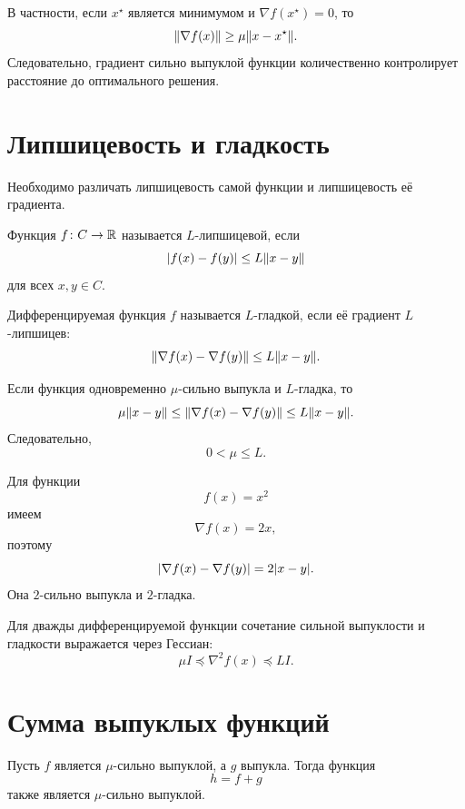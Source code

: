 В частности, если \(x^\star\) является минимумом и
\(\nabla f(x^\star)=0\), то
\[
    \lVert\nabla f(x)\rVert
    \ge
    \mu\lVert x-x^\star\rVert.
\]
Следовательно, градиент сильно выпуклой функции количественно
контролирует расстояние до оптимального решения.

\section{Липшицевость и гладкость}

Необходимо различать липшицевость самой функции и липшицевость её
градиента.

\begin{definition}
Функция \(f\colon C\to\mathbb{R}\) называется \(L\)-липшицевой, если
\[
    \lvert f(x)-f(y)\rvert
    \le
    L\lVert x-y\rVert
\]
для всех \(x,y\in C\).
\end{definition}

\begin{definition}
Дифференцируемая функция \(f\) называется \(L\)-гладкой, если её
градиент \(L\)-липшицев:
\[
    \lVert\nabla f(x)-\nabla f(y)\rVert
    \le
    L\lVert x-y\rVert.
\]
\end{definition}

Если функция одновременно \(\mu\)-сильно выпукла и \(L\)-гладка, то
\[
    \mu\lVert x-y\rVert
    \le
    \lVert\nabla f(x)-\nabla f(y)\rVert
    \le
    L\lVert x-y\rVert.
\]
Следовательно,
\[
    0<\mu\le L.
\]

Для функции
\[
    f(x)=x^2
\]
имеем
\[
    \nabla f(x)=2x,
\]
поэтому
\[
    \lvert\nabla f(x)-\nabla f(y)\rvert
    =
    2\lvert x-y\rvert.
\]
Она \(2\)-сильно выпукла и \(2\)-гладка.

Для дважды дифференцируемой функции сочетание сильной выпуклости и
гладкости выражается через Гессиан:
\[
    \mu I
    \preceq
    \nabla^2f(x)
    \preceq
    LI.
\]

\section{Сумма выпуклых функций}

\begin{theorem}
Пусть \(f\) является \(\mu\)-сильно выпуклой, а \(g\) выпукла.
Тогда функция
\[
    h=f+g
\]
также является \(\mu\)-сильно выпуклой.
\end{theorem}


